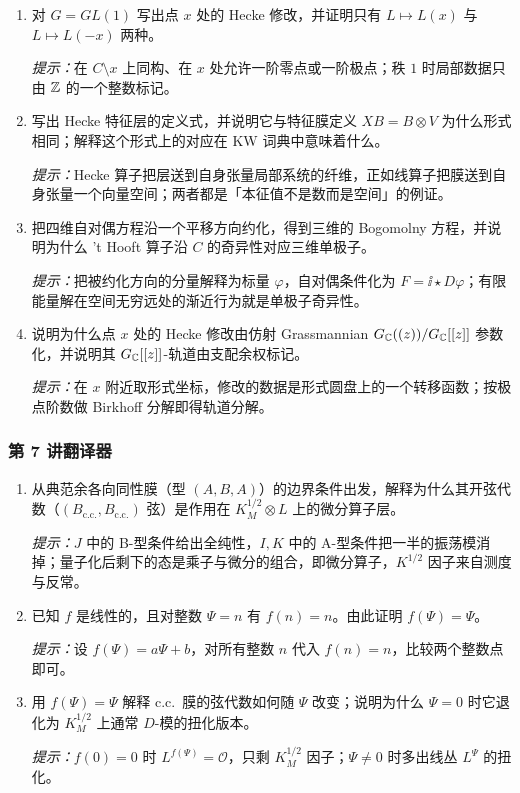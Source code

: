 \begin{enumerate}[label=\arabic*.,start=21,leftmargin=2.4em,itemsep=6pt]
\item 对 $G=GL(1)$ 写出点 $x$ 处的 Hecke 修改，并证明只有 $L\mapsto L(x)$ 与 $L\mapsto L(-x)$ 两种。
\par\smallskip\noindent\emph{提示：}在 $C\setminus x$ 上同构、在 $x$ 处允许一阶零点或一阶极点；秩 $1$ 时局部数据只由 $\mathbb{Z}$ 的一个整数标记。

\item 写出 Hecke 特征层的定义式，并说明它与特征膜定义 $XB=B\otimes V$ 为什么形式相同；解释这个形式上的对应在 KW 词典中意味着什么。
\par\smallskip\noindent\emph{提示：}Hecke 算子把层送到自身张量局部系统的纤维，正如线算子把膜送到自身张量一个向量空间；两者都是「本征值不是数而是空间」的例证。

\item 把四维自对偶方程沿一个平移方向约化，得到三维的 Bogomolny 方程，并说明为什么 't Hooft 算子沿 $C$ 的奇异性对应三维单极子。
\par\smallskip\noindent\emph{提示：}把被约化方向的分量解释为标量 $\varphi$，自对偶条件化为 $F=\ii\star D\varphi$；有限能量解在空间无穷远处的渐近行为就是单极子奇异性。

\item 说明为什么点 $x$ 处的 Hecke 修改由仿射 Grassmannian $G_{\mathbb{C}}((z))/G_{\mathbb{C}}[[z]]$ 参数化，并说明其 $G_{\mathbb{C}}[[z]]$-轨道由支配余权标记。
\par\smallskip\noindent\emph{提示：}在 $x$ 附近取形式坐标，修改的数据是形式圆盘上的一个转移函数；按极点阶数做 Birkhoff 分解即得轨道分解。
\end{enumerate}

\subsubsection*{第 7 讲\quad 翻译器}

\begin{enumerate}[label=\arabic*.,start=25,leftmargin=2.4em,itemsep=6pt]
\item 从典范余各向同性膜（型 $(A,B,A)$）的边界条件出发，解释为什么其开弦代数（$(B_{\mathrm{c.c.}},B_{\mathrm{c.c.}})$ 弦）是作用在 $K_M^{1/2}\otimes L$ 上的微分算子层。
\par\smallskip\noindent\emph{提示：}$J$ 中的 B-型条件给出全纯性，$I,K$ 中的 A-型条件把一半的振荡模消掉；量子化后剩下的态是乘子与微分的组合，即微分算子，$K^{1/2}$ 因子来自测度与反常。

\item 已知 $f$ 是线性的，且对整数 $\Psi=n$ 有 $f(n)=n$。由此证明 $f(\Psi)=\Psi$。
\par\smallskip\noindent\emph{提示：}设 $f(\Psi)=a\Psi+b$，对所有整数 $n$ 代入 $f(n)=n$，比较两个整数点即可。

\item 用 $f(\Psi)=\Psi$ 解释 c.c.\ 膜的弦代数如何随 $\Psi$ 改变；说明为什么 $\Psi=0$ 时它退化为 $K_M^{1/2}$ 上通常 $D$-模的扭化版本。
\par\smallskip\noindent\emph{提示：}$f(0)=0$ 时 $L^{f(\Psi)}=\mathcal O$，只剩 $K_M^{1/2}$ 因子；$\Psi\neq0$ 时多出线丛 $L^\Psi$ 的扭化。
\end{enumerate}

